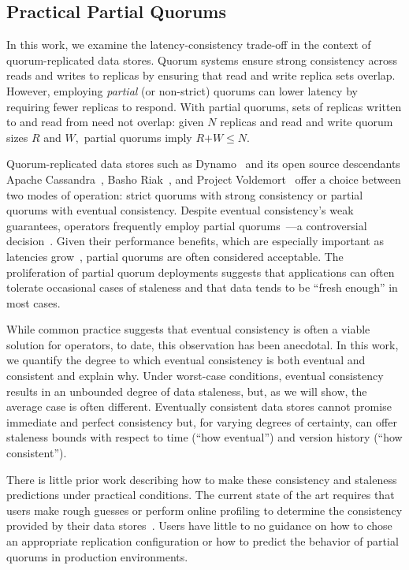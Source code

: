 \documentclass{vldb}
\begin{document}
\subsection{Practical Partial Quorums}

In this work, we examine the latency-consistency trade-off in the context of
quorum-replicated data stores. Quorum systems ensure
strong consistency across reads and writes to replicas by ensuring
that read and write replica sets overlap. However, employing
\textit{partial} (or non-strict) quorums can lower latency by
requiring fewer replicas to respond.  With partial quorums, sets of
replicas written to and read from need not overlap: given $N$ replicas
and read and write quorum sizes $R$ and $W,$ partial quorums imply
$R$$+$$W$$\leq$$N$.

Quorum-replicated data stores such as Dynamo~\cite{dynamo} and its
open source descendants Apache Cassandra~\cite{cassandra-sigmod},
Basho Riak~\cite{riak}, and Project Voldemort~\cite{voldemortpub}
offer a choice between two modes of operation: strict quorums with
strong consistency or partial quorums with eventual
consistency. Despite eventual consistency's weak guarantees, operators
frequently employ partial quorums~\cite{cassandra-docs,
  cassandradefault,feinbergpc,reddit, outbrain, maxperfblog}---a
controversial decision~\cite{hamilton-cap, cops, walter, urbanmyths}.
Given their performance benefits, which are especially important as
latencies grow~\cite{abadilatconsist, feinbergpc, hamilton-cap,
  helland}, partial quorums are often considered acceptable.  The proliferation
of partial quorum deployments suggests that applications can often
tolerate occasional cases of staleness and that data tends to be
``fresh enough'' in most cases.

While common practice suggests that eventual consistency is often a viable
solution for operators, to date, this observation has been
anecdotal. In this work, we quantify the degree to which eventual
consistency is both eventual and consistent and explain why. Under
worst-case conditions, eventual consistency results in an unbounded
degree of data staleness, but, as we will show, the average case is
often different.  Eventually consistent data stores cannot promise
immediate and perfect consistency but, for varying degrees of
certainty, can offer staleness bounds with respect to time (``how
eventual'') and version history (``how consistent'').

There is little prior work describing how to make these consistency
and staleness predictions under practical conditions.  The current
state of the art requires that users make rough guesses or perform
online profiling to determine the consistency provided by their data
stores~\cite{measure-consistency, podc-hpl, consistency-cidr}. Users
have little to no guidance on how to chose an appropriate
replication configuration or how to predict the behavior of partial
quorums in production environments.
\end{document}
